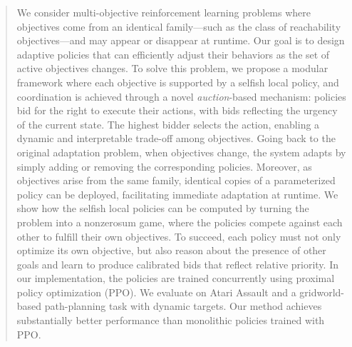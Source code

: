 \begin{abstract}
We consider multi-objective reinforcement learning problems where objectives come from an identical family---such as the class of reachability objectives---and may appear or disappear at runtime.
Our goal is to design adaptive policies that can efficiently adjust their behaviors as the set of active objectives changes.
To solve this problem, we propose a modular framework where each objective is supported by a selfish local policy, and coordination is achieved through a novel \emph{auction}-based mechanism:
policies bid for the right to execute their actions, with bids reflecting the urgency of the current state.
The highest bidder selects the action, enabling a dynamic and interpretable trade-off among objectives.
Going back to the original adaptation problem, when objectives change, the system adapts by simply adding or removing the corresponding policies.
Moreover, as objectives arise from the same family, identical copies of a parameterized policy can be deployed, facilitating immediate adaptation at runtime.
We show how the selfish local policies can be computed by turning the problem into a nonzerosum game, where the policies compete against each other to fulfill their own objectives.
To succeed, each policy must not only optimize its own objective, but also reason about the presence of other goals and learn to produce calibrated bids that reflect relative priority.
In our implementation, the policies are trained concurrently using proximal policy optimization (PPO).
We evaluate on Atari Assault and a gridworld-based path-planning task with dynamic targets.
Our method achieves substantially better performance than monolithic policies trained with PPO. 
\end{abstract}
